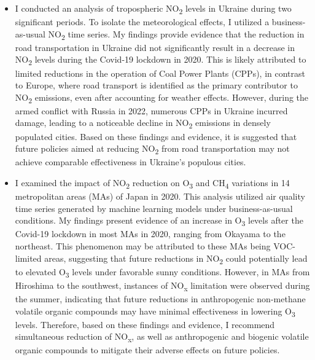 \begin{itemize}
    \item I conducted an analysis of tropospheric NO\textsubscript{2} levels in Ukraine during two significant periods. To isolate the meteorological effects, I utilized a business-as-usual NO\textsubscript{2} time series. My findings provide evidence that the reduction in road transportation in Ukraine did not significantly result in a decrease in NO\textsubscript{2} levels during the Covid-19 lockdown in 2020. This is likely attributed to limited reductions in the operation of Coal Power Plants (CPPs), in contrast to Europe, where road transport is identified as the primary contributor to NO\textsubscript{2} emissions, even after accounting for weather effects. However, during the armed conflict with Russia in 2022, numerous CPPs in Ukraine incurred damage, leading to a noticeable decline in NO\textsubscript{2} emissions in densely populated cities. Based on these findings and evidence, it is suggested that future policies aimed at reducing NO\textsubscript{2} from road transportation may not achieve comparable effectiveness in Ukraine's populous cities.
    \item I examined the impact of NO\textsubscript{2} reduction on O\textsubscript{3} and CH\textsubscript{4} variations in 14 metropolitan areas (MAs) of Japan in 2020. This analysis utilized air quality time series generated by machine learning models under business-as-usual conditions. My findings present evidence of an increase in O\textsubscript{3} levels after the Covid-19 lockdown in most MAs in 2020, ranging from Okayama to the northeast. This phenomenon may be attributed to these MAs being VOC-limited areas, suggesting that future reductions in NO\textsubscript{2} could potentially lead to elevated O\textsubscript{3} levels under favorable sunny conditions. However, in MAs from Hiroshima to the southwest, instances of NO\textsubscript{x} limitation were observed during the summer, indicating that future reductions in anthropogenic non-methane volatile organic compounds may have minimal effectiveness in lowering O\textsubscript{3} levels. Therefore, based on these findings and evidence, I recommend simultaneous reduction of NO\textsubscript{x}, as well as anthropogenic and biogenic volatile organic compounds to mitigate their adverse effects on future policies.

\end{itemize}
